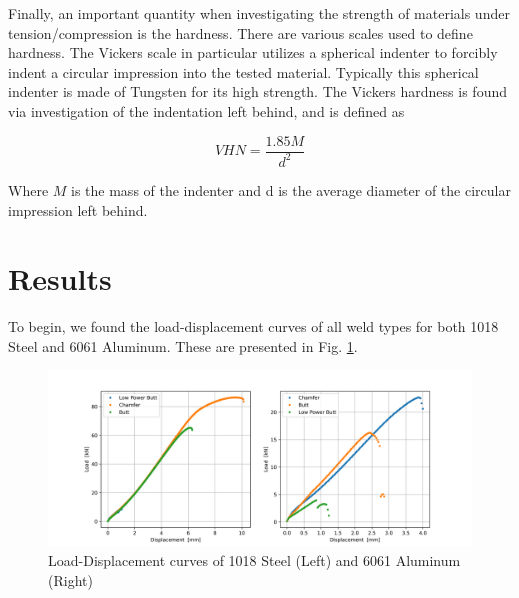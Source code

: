 \documentclass{article}
\begin{document}
Finally, an important quantity when investigating the strength of materials under tension/compression is the hardness. There are various scales used to define hardness. The Vickers scale in particular utilizes a spherical indenter to forcibly indent a circular impression into the tested material. Typically this spherical indenter is made of Tungsten for its high strength. The Vickers hardness is found via investigation of the indentation left behind, and is defined as

\begin{equation}
    VHN = \frac{1.85M}{d^2}
\end{equation}

Where $M$ is the mass of the indenter and d is the average diameter of the circular impression left behind. 

\newpage
\section{Results}
To begin, we found the load-displacement curves of all weld types for both 1018 Steel and 6061 Aluminum. These are presented in Fig. \ref{fig:q1}. 

\begin{figure}[!hp!]
    \centering
    \includegraphics[width=\linewidth]{plots/q1-1018-6061.png}
    \caption{Load-Displacement curves of 1018 Steel (Left) and 6061 Aluminum (Right)}
    \label{fig:q1}
\end{figure}
\end{document}
